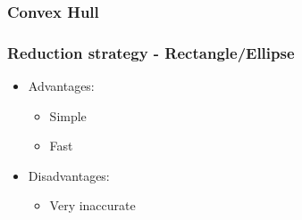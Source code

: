 \subsubsection{Convex Hull}
\begin{frame}
\frametitle{Reduction strategy - Rectangle/Ellipse}
\begin{multicols}{2}
	\begin{itemize}
		\item Advantages:
		\begin{itemize}
			\item Simple
			\item Fast
		\end{itemize}
	\end{itemize}
\columnbreak
	\begin{itemize}
		\item Disadvantages:
		\begin{itemize}
			\item Very inaccurate
			\linebreak
		\end{itemize}
	\end{itemize}
\end{multicols}

\end{frame}
%
